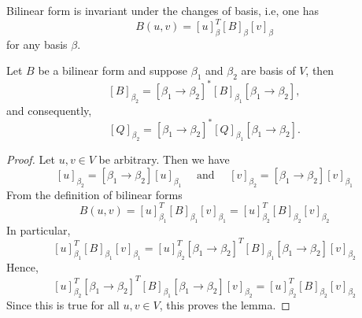 ﻿\documentclass[12pt]{article}
\begin{document}
\begin{proposition}
    Bilinear form is invariant under the changes of basis, i.e, one has 
    \[
        B(u,v) = [u]_{\beta}^T [B]_{\beta} [v]_{\beta}
    \]
    for any basis $\beta$.
\end{proposition}
\begin{lemma}
    Let $B$ be a bilinear form and suppose $\beta_1$ and $\beta_2$ are basis of $V$, then 
    \[
        [B]_{\beta_2}  = [\beta_1 \to \beta_2]^*[B]_{\beta_1}[\beta_1 \to \beta_2],
    \]
    and consequently,
    \[
        [Q]_{\beta_2} = [\beta_1 \to \beta_2]^*[Q]_{\beta_1}[\beta_1 \to \beta_2].
    \]
\end{lemma}
\begin{proof}
    Let $u, v \in V$ be arbitrary. Then we have 
    \[
        [u]_{\beta_2} = [\beta_1 \to \beta_2][u]_{\beta_1} \quad \text{ and }\quad [v]_{\beta_2} = [\beta_1 \to \beta_2][v]_{\beta_1}
    \]
    From the definition of bilinear forms
    \[
        B(u,v) = [u]_{\beta_1}^T [B]_{\beta_1} [v]_{\beta_1} = [u]_{\beta_2}^T [B]_{\beta_2} [v]_{\beta_2}
    \]
    In particular,  
    \[
        [u]_{\beta_1}^T [B]_{\beta_1} [v]_{\beta_1} = [u]^T_{\beta_2} [\beta_1 \to \beta_2]^T [B]_{\beta_{1}} [\beta_1 \to \beta_2][v]_{\beta_2}
    \]
    Hence, 
    \[
    [u]^T_{\beta_2} [\beta_1 \to \beta_2]^T [B]_{\beta_{1}} [\beta_1 \to \beta_2][v]_{\beta_2} = [u]_{\beta_2}^T [B]_{\beta_2} [v]_{\beta_2}
    \]
    Since this is true for all $u,v \in V$, this proves the lemma.
\end{proof}
\end{document}
